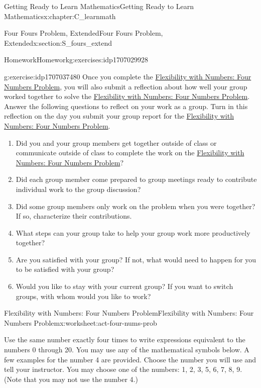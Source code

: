 \documentclass[oneside,10pt,]{book}
\numberwithin{equation}{chapter}
\begin{document}
\begin{chapterptx}{Getting Ready to Learn Mathematics}{}{Getting Ready to Learn Mathematics}{}{}{x:chapter:C_learnmath}
\begin{sectionptx}{Four Fours Problem, Extended}{}{Four Fours Problem, Extended}{}{}{x:section:S_fours_extend}
\begin{exercises-subsection}{Homework}{}{Homework}{}{}{g:exercises:idp1707029928}
\begin{divisionexercise}{4}{}{}{g:exercise:idp1707037480}%
Once you complete the \hyperref[x:worksheet:act-four-nums-prob]{Flexibility with Numbers: Four Numbers Problem}, you will also submit a reflection about how well your group worked together to solve the \hyperref[x:worksheet:act-four-nums-prob]{Flexibility with Numbers: Four Numbers Problem}. Answer the following questions to reflect on your work as a group. Turn in this reflection on the day you submit your group report for the \hyperref[x:worksheet:act-four-nums-prob]{Flexibility with Numbers: Four Numbers Problem}.%
\begin{enumerate}[font=\bfseries,label=(\alph*),ref=\alph*]
\item{}Did you and your group members get together outside of class or communicate outside of class to complete the work on the \hyperref[x:worksheet:act-four-nums-prob]{Flexibility with Numbers: Four Numbers Problem}?%
\item{}Did each group member come prepared to group meetings ready to contribute individual work to the group discussion?%
\item{}Did some group members only work on the problem when you were together? If so, characterize their contributions.%
\item{}What steps can your group take to help your group work more productively together?%
\item{}Are you satisfied with your group? If not, what would need to happen for you to be satisfied with your group?%
\item{}Would you like to stay with your current group? If you want to switch groups, with whom would you like to work?%
\end{enumerate}
\end{divisionexercise}%
\end{exercises-subsection}
%
%
\typeout{************************************************}
\typeout{************************************************}
%
\begin{worksheet-subsection}{Flexibility with Numbers: Four Numbers Problem}{}{Flexibility with Numbers: Four Numbers Problem}{}{}{x:worksheet:act-four-nums-prob}
\begin{introduction}{}%
Use the same number exactly four times to write expressions equivalent to the numbers 0 through 20. You may use any of the mathematical symbols below. A few examples for the number 4 are provided. Choose the number you will use and tell your instructor. You may choose one of the numbers: 1, 2, 3, 5, 6, 7, 8, 9. (Note that you may not use the number 4.)%

\end{introduction}
\end{worksheet-subsection}
\end{sectionptx}
\end{chapterptx}
\end{document}
